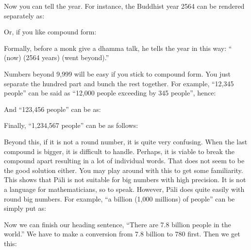 Now you can tell the year. For instance, the Buddhist year 2564 can be rendered separately as:


Or, if you like compound form:


Formally, before a monk give a dhamma talk, he tells the year in this way: `` (now)  (2564 years)  (went beyond).''

Numbers beyond 9,999 will be easy if you stick to compound form. You just separate the hundred part and bunch the rest together. For example, ``12,345 people'' can be said as ``12,000 people exceeding by 345 people'', hence:


And ``123,456 people'' can be as:


Finally, ``1,234,567 people'' can be as follows:


Beyond this, if it is not a round number, it is quite very confusing. When the last compound is bigger, it is difficult to handle. Perhaps, it is viable to break the compound apart resulting in a lot of individual words. That does not seem to be the good solution either. You may play around with this to get some familiarity. This shows that P\=ali is not suitable for big numbers with high precision. It is not a language for mathematicians, so to speak. However, P\=ali does quite easily with round big numbers. For example, ``a billion (1,000 millions) of people'' can be simply put as:


Now we can finish our heading sentence, ``There are 7.8 billion people in the world.'' We have to make a conversion from 7.8 billion to 780  first. Then we get this:


